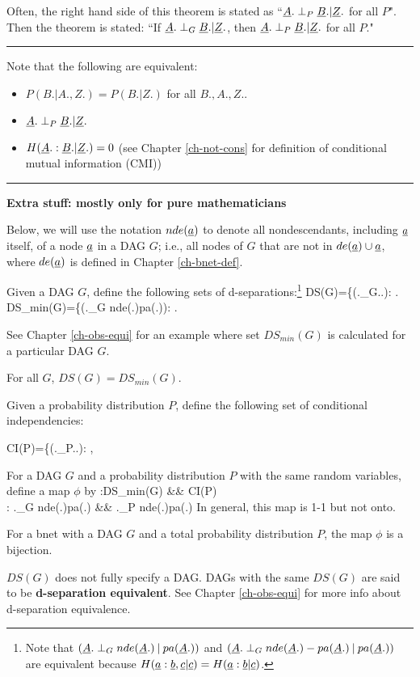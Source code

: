Often, the right hand side
of this theorem is stated as 
``${\underline{A}}.\perp_P {\underline{B}}.|{\underline{Z}}.$
for all $P$".
Then the theorem is stated:
``If 
${\underline{A}}.\perp_G {\underline{B}}.|{\underline{Z}}.$, then
${\underline{A}}.\perp_P {\underline{B}}.|{\underline{Z}}.$ for all $P$."  

\hrule
Note that 
the following are equivalent:
\begin{itemize}
\item
$P(B.|A., Z.)=P(B.|Z.)$ for all $B., A., Z.$.
\item
${\underline{A}}.\perp_P {\underline{B}}.|{\underline{Z}}.$
\item
$H({\underline{A}}.:{\underline{B}}.|{\underline{Z}}.)=0$
(see Chapter \ref{ch-not-cons}
for definition of
 conditional mutual information (CMI))
\end{itemize}
\hrule\noindent
{\bf Extra stuff: mostly only for 
 pure mathematicians}

Below, we will use
the notation $nde({\underline{a}})$
to denote
all nondescendants,
including ${\underline{a}}$ itself, 
of a node ${\underline{a}}$
in a DAG $G$; i.e.,
all nodes of $G$ that are not
in $de({\underline{a}})\cup {\underline{a}}$, where
$de({\underline{a}})$
is defined in Chapter \ref{ch-bnet-def}.

Given a DAG $G$, define 
the following
sets of d-separations:\footnote{
Note that
$({\underline{A}}.\perp_G
nde({\underline{A}}.){\:\mathbf{|}\:} pa({\underline{A}}.))$ and
$({\underline{A}}.\perp_G
nde({\underline{A}}.)-pa({\underline{A}}.){\:\mathbf{|}\:} pa({\underline{A}}.))$
are
equivalent
because
$H({\underline{a}}:{\underline{b}}, {\underline{c}}|{\underline{c}})=
H({\underline{a}}:{\underline{b}}|{\underline{c}})$.
}
\beq
DS(G)=\{(\rvA.\perp_G\rvB.\cond\rvZ.):
\;.
\eeq
\beq
DS_{min}(G)=\{(\rvA.\perp_G
nde(\rvA.)\cond pa(\rvA.)):
\;.
\eeq

See Chapter \ref{ch-obs-equi}
for an example
where set $DS_{min}(G)$
is calculated for 
a particular DAG $G$.

\begin{claim}
For all $G$, $DS(G)=DS_{min}(G)$.
\end{claim}

Given a probability distribution  $P$, 
define the following
set of conditional independencies:

\beq
CI(P)=\{(\rvA.\perp_P\rvB.\cond \rvZ.):
\;,
\eeq


For a DAG $G$
and a probability
distribution $P$
with the same random variables,
define  a map $\phi$
by
\beqa
\phi:DS_{min}(G) &\rarrow& CI(P)
\\
\phi: \rvA.\perp_G nde(\rvA.)\cond pa(\rvA.)
&\mapsto&
\rvA.\perp_P nde(\rvA.)\cond pa(\rvA.)
\eeqa
In general, this map
is 1-1 but not onto.


\begin{claim}
For a bnet 
with a DAG $G$
and a total probability distribution $P$,
the map $\phi$ is a bijection.
\end{claim}

$DS(G)$
does not fully specify a DAG.
DAGs with the same 
$DS(G)$ are said to be
{\bf d-separation equivalent}.
See Chapter \ref{ch-obs-equi}
for more info about 
d-separation equivalence.
